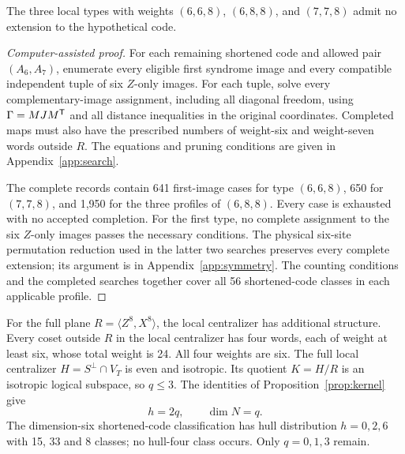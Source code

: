 \begin{proposition}\label{prop:17-mixed}
The three local types with weights \((6,6,8)\), \((6,8,8)\), and
\((7,7,8)\) admit no extension to the hypothetical code.
\end{proposition}
\begin{proof}[Computer-assisted proof]
For each remaining shortened code and allowed pair \((A_6,A_7)\),
enumerate every
eligible first syndrome image and every compatible independent tuple of
six \(Z\)-only images. For each tuple, solve every complementary-image
assignment, including all diagonal freedom, using
\(\Gamma=MJM^\mathsf T\) and all distance inequalities in the original coordinates.
Completed maps must also have the prescribed numbers of weight-six and
weight-seven words outside \(R\). The equations and pruning conditions
are given in
Appendix~\ref{app:search}.

The complete records contain 641 first-image cases for type \((6,6,8)\),
650 for \((7,7,8)\), and 1,950 for the three profiles of \((6,8,8)\).
Every case is exhausted with no accepted completion. For the first type,
no complete assignment to the six \(Z\)-only images passes the
necessary conditions. The physical six-site
permutation reduction used in the latter two searches preserves every
complete extension; its argument is in Appendix~\ref{app:symmetry}.
The counting conditions and the completed searches together cover all
56 shortened-code classes in each applicable profile.
\end{proof}

For the full plane \(R=\langle Z^8,X^8\rangle\), the local
centralizer has additional structure. Every coset outside \(R\) in the
local centralizer has four words, each of weight at least six, whose
total weight is 24. All four weights are six. The full
local centralizer \(H=S^\perp\cap V_T\) is even and isotropic.
Its quotient \(K=H/R\) is an isotropic logical subspace, so \(q\leq3\).
The identities of Proposition~\ref{prop:kernel} give
\[
 h=2q,\qquad \dim N=q.
\]
The dimension-six shortened-code classification has hull distribution
\(h=0,2,6\) with 15, 33 and 8 classes; no hull-four class occurs.
Only \(q=0,1,3\) remain.

